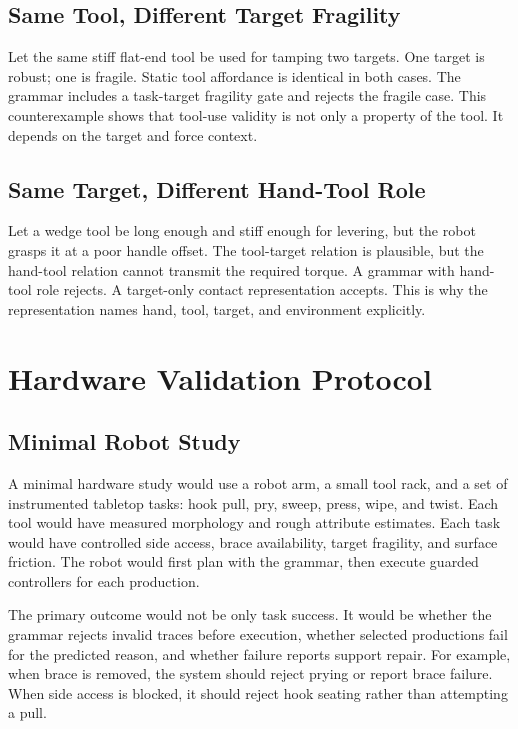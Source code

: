 \documentclass{article}
\begin{document}
\subsection{Same Tool, Different Target Fragility}

Let the same stiff flat-end tool be used for tamping two targets. One target is robust; one is fragile. Static tool affordance is identical in both cases. The grammar includes a task-target fragility gate and rejects the fragile case. This counterexample shows that tool-use validity is not only a property of the tool. It depends on the target and force context.

\subsection{Same Target, Different Hand-Tool Role}

Let a wedge tool be long enough and stiff enough for levering, but the robot grasps it at a poor handle offset. The tool-target relation is plausible, but the hand-tool relation cannot transmit the required torque. A grammar with hand-tool role rejects. A target-only contact representation accepts. This is why the representation names hand, tool, target, and environment explicitly.

\section{Hardware Validation Protocol}

\subsection{Minimal Robot Study}

A minimal hardware study would use a robot arm, a small tool rack, and a set of instrumented tabletop tasks: hook pull, pry, sweep, press, wipe, and twist. Each tool would have measured morphology and rough attribute estimates. Each task would have controlled side access, brace availability, target fragility, and surface friction. The robot would first plan with the grammar, then execute guarded controllers for each production.

The primary outcome would not be only task success. It would be whether the grammar rejects invalid traces before execution, whether selected productions fail for the predicted reason, and whether failure reports support repair. For example, when brace is removed, the system should reject prying or report brace failure. When side access is blocked, it should reject hook seating rather than attempting a pull.
\end{document}

